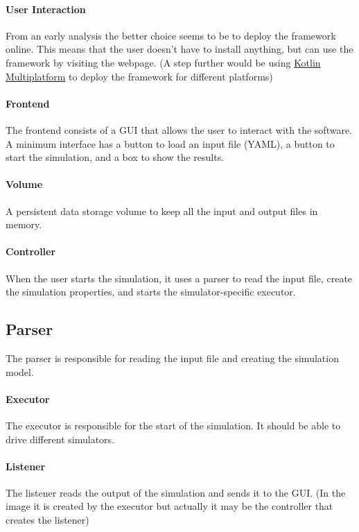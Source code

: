 \documentclass[12pt,a4paper,openright,twoside]{book}
\begin{document}
\paragraph*{User Interaction} From an early analysis the better choice seems to be to deploy the framework online.
This means that the user doesn't have to install anything, but can use the framework by visiting the webpage.
(A step further would be using \href{https://kotlinlang.org/docs/multiplatform.html#kotlin-multiplatform-use-cases}{Kotlin Multiplatform} to deploy the framework for different platforms)

\paragraph*{Frontend} The frontend consists of a GUI that allows the user to interact with the software. 
A minimum interface has a button to load an input file (YAML), a button to start the simulation, and a box to show the results.

\paragraph*{Volume} A persistent data storage volume to keep all the input and output files in memory.

\paragraph*{Controller} When the user starts the simulation, it uses a parser to read the input file, create the simulation properties,
and starts the simulator-specific executor.

\subsection{Parser} 
The parser is responsible for reading the input file and creating the simulation model.

\paragraph*{Executor} The executor is responsible for the start of the simulation. It should be able to drive different simulators.

\paragraph*{Listener} The listener reads the output of the simulation and sends it to the GUI.
(In the image it is created by the executor but actually it may be the controller that creates the listener)
\end{document}
